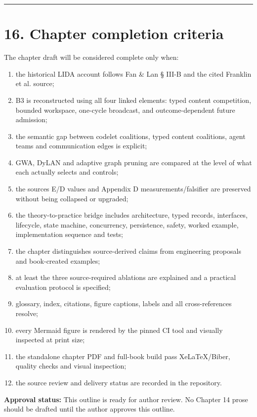 \begin{center}\rule{0.5\linewidth}{0.5pt}\end{center}

\section{16. Chapter completion criteria}\label{16-chapter-completion-criteria}

The chapter draft will be considered complete only when:

\begin{enumerate}
\def\labelenumi{\arabic{enumi}.}
\tightlist
\item
  the historical LIDA account follows Fan \& Lan § III-B and the cited Franklin et al. source;
\item
  B3 is reconstructed using all four linked elements: typed content competition, bounded workspace, one-cycle broadcast, and outcome-dependent future admission;
\item
  the semantic gap between codelet coalitions, typed content coalitions, agent teams and communication edges is explicit;
\item
  GWA, DyLAN and adaptive graph pruning are compared at the level of what each actually selects and controls;
\item
  the source\textquotesingle s E/D values and Appendix D measurements/falsifier are preserved without being collapsed or upgraded;
\item
  the theory-to-practice bridge includes architecture, typed records, interfaces, lifecycle, state machine, concurrency, persistence, safety, worked example, implementation sequence and tests;
\item
  the chapter distinguishes source-derived claims from engineering proposals and book-created examples;
\item
  at least the three source-required ablations are explained and a practical evaluation protocol is specified;
\item
  glossary, index, citations, figure captions, labels and all cross-references resolve;
\item
  every Mermaid figure is rendered by the pinned CI tool and visually inspected at print size;
\item
  the standalone chapter PDF and full-book build pass XeLaTeX/Biber, quality checks and visual inspection;
\item
  the source review and delivery status are recorded in the repository.
\end{enumerate}

\textbf{Approval status:} This outline is ready for author review. No Chapter 14 prose should be drafted until the author approves this outline.
